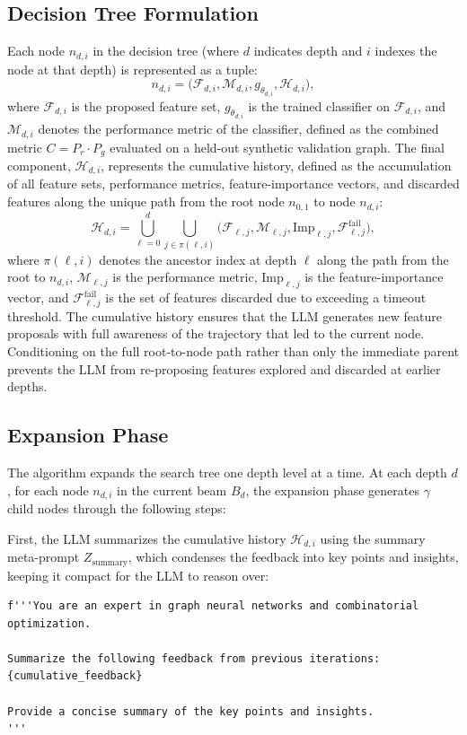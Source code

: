 \subsection{Decision Tree Formulation}

Each node $n_{d,i}$ in the decision tree (where $d$ indicates depth and $i$ indexes the
node at that depth) is represented as a tuple:
\[
n_{d,i} = \big(\mathcal{F}_{d,i}, \mathcal{M}_{d,i}, g_{\theta_{d,i}}, \mathcal{H}_{d,i}\big),
\]
where $\mathcal{F}_{d,i}$ is the proposed feature set, $g_{\theta_{d,i}}$ is the trained
classifier on $\mathcal{F}_{d,i}$, and $\mathcal{M}_{d,i}$ denotes the performance metric
of the classifier, defined as the combined metric $C = P_r \cdot P_g$ evaluated on a
held-out synthetic validation graph. The final component, $\mathcal{H}_{d,i}$, represents
the cumulative history, defined as the accumulation of all feature sets, performance
metrics, feature-importance vectors, and discarded features along the unique path from the
root node $n_{0,1}$ to node $n_{d,i}$:
\[
\mathcal{H}_{d,i} = \bigcup_{\ell=0}^{d} \bigcup_{j \in \pi(\ell,i)}
\Big(\mathcal{F}_{\ell,j}, \mathcal{M}_{\ell,j}, \text{Imp}_{\ell,j}, \mathcal{F}^{\text{fail}}_{\ell,j}\Big),
\]
where $\pi(\ell,i)$ denotes the ancestor index at depth $\ell$ along the path from the
root to $n_{d,i}$, $\mathcal{M}_{\ell,j}$ is the performance metric, $\text{Imp}_{\ell,j}$ is the
feature-importance vector, and $\mathcal{F}^{\text{fail}}_{\ell,j}$ is the set of features
discarded due to exceeding a timeout threshold. The cumulative history ensures that the LLM
generates new feature proposals with full awareness of the trajectory that led to the
current node. Conditioning on the full root-to-node path rather than only the immediate
parent prevents the LLM from re-proposing features explored and discarded at earlier
depths.

\subsection{Expansion Phase}

The algorithm expands the search tree one depth level at a time. At each depth $d$, for
each node $n_{d,i}$ in the current beam $B_d$, the expansion phase generates $\gamma$
child nodes through the following steps:

First, the LLM summarizes the cumulative history $\mathcal{H}_{d,i}$ using the summary
meta-prompt $Z_{\text{summary}}$, which condenses the feedback into key points and
insights, keeping it compact for the LLM to reason over:
\begin{verbatim}
f'''You are an expert in graph neural networks and combinatorial optimization.

Summarize the following feedback from previous iterations:
{cumulative_feedback}

Provide a concise summary of the key points and insights.
'''
\end{verbatim}

